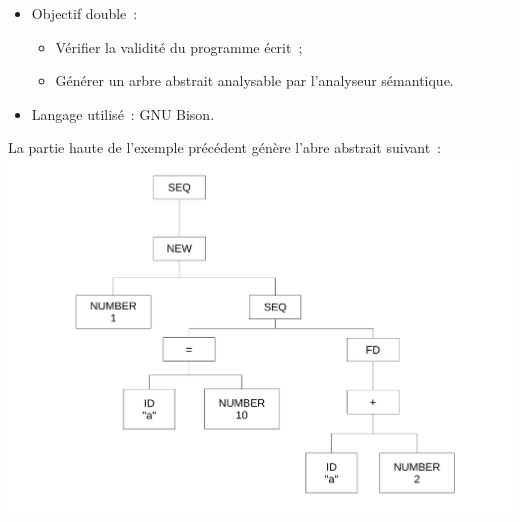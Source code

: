 \begin{frame}
	\begin{itemize}
	\item Objectif double~: 
		\begin{itemize}
		\item Vérifier la validité du programme écrit~;
		\item Générer un arbre abstrait analysable par l'analyseur sémantique.
		\end{itemize}
	\item Langage utilisé~: GNU Bison.
	\end{itemize}
\end{frame}

\begin{frame}
La partie haute de l'exemple précédent génère l'abre abstrait suivant~:
\includegraphics[scale=0.3]{doc/Presentation/img/arbre.pdf}
\end{frame}

